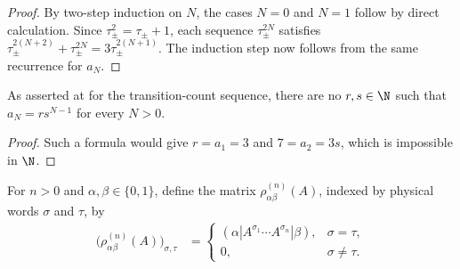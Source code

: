 \begin{proof}
    \leanok
    By two-step induction on $N$, the cases $N=0$ and $N=1$ follow by direct
    calculation. Since $\tau_\pm^2=\tau_\pm+1$, each sequence
    $\tau_\pm^{2N}$ satisfies
    $\tau_\pm^{2(N+2)}+\tau_\pm^{2N}=3\tau_\pm^{2(N+1)}$. The induction step
    now follows from the same recurrence for $a_N$.
\end{proof}

\begin{lemma}
    \label{thm:cpsv_fibonacci_transition_not_geometric}
    \leanok
    As asserted at \cite[Appendix~D, line~2125]{Cirac2016MPDO_arXiv} for the
    transition-count sequence, there are no $r,s\in\N$ such that
    $a_N=rs^{N-1}$ for every $N>0$.
\end{lemma}

\begin{proof}
    \leanok
    Such a formula would give $r=a_1=3$ and $7=a_2=3s$, which is impossible
    in $\N$.
\end{proof}

\begin{definition}
    \label{def:cpsv_fibonacci_open_boundary_operator}
    \leanok
    For $n>0$ and $\alpha,\beta\in\{0,1\}$, define the matrix
    $\rho^{(n)}_{\alpha\beta}(A)$, indexed by physical words $\sigma$ and $\tau$, by
    \begin{align}
        \bigl(\rho^{(n)}_{\alpha\beta}(A)\bigr)_{\sigma,\tau}
         & =\begin{cases}
                (\alpha|A^{\sigma_1}\cdots A^{\sigma_n}|\beta), & \sigma=\tau,   \\
                0,                                              & \sigma\ne\tau.
            \end{cases}
    \end{align}
\end{definition}


